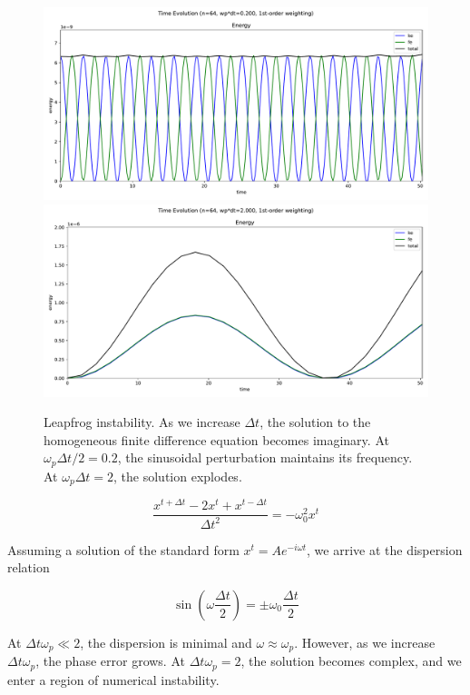 \documentclass[%
 reprint,
 amsmath,amssymb,
 aps,
]{revtex4-2}
\begin{document}
\begin{figure}[h]
\includegraphics[width=0.9\linewidth]{proj2/leapfrog-stable.pdf}
\includegraphics[width=0.9\linewidth]{proj2/leapfrog-unstable.pdf}
\caption{\label{fig:leapfrog-init}Leapfrog instability. As we increase $\Delta t$, the solution to the homogeneous finite difference equation becomes imaginary. At $\omega_p \Delta t / 2 = 0.2$, the sinusoidal perturbation maintains its frequency. At $\omega_p \Delta t = 2$, the solution explodes.}
\end{figure}

\begin{equation}
\frac{x^{t + \Delta t} - 2 x^t + x^{t - \Delta t}}{\Delta t^2} = - \omega_0 ^2 x^t
\end{equation}

Assuming a solution of the standard form $x^t = A e^{- i \omega t}$, we arrive at the dispersion relation

\begin{equation}
\sin \left( \omega \frac{\Delta t}{2} \right) = \pm \omega_0\frac{\Delta t}{2}
\end{equation}

At $\Delta t \omega_p \ll 2$, the dispersion is minimal and $\omega \approx \omega_p$. However, as we increase $\Delta t \omega_p$, the phase error grows. At $\Delta t \omega_p = 2$, the solution becomes complex, and we enter a region of numerical instability.

\nocite{*}

\end{document}
